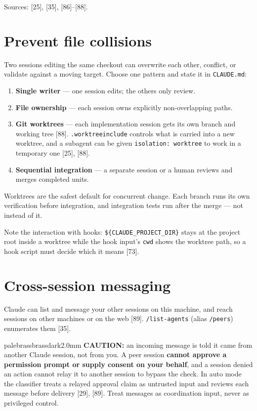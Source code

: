 \documentclass[11pt,a4paper,twoside,openany]{book}
\begin{document}
Sources: [25], [35], [86]–[88].


\FloatBarrier
\setcounter{section}{1}
\section{Prevent file collisions}

Two sessions editing the same checkout can overwrite each other, conflict, or validate against a moving target. Choose one pattern and state it in \texttt{CLAUDE.\allowbreak{}md}:


\begin{enumerate}
\item \textbf{Single writer} — one session edits; the others only review.
\item \textbf{File ownership} — each session owns explicitly non-overlapping paths.
\item \textbf{Git worktrees} — each implementation session gets its own branch and working tree [88]. \texttt{.\allowbreak{}worktreeinc\allowbreak{}lude} controls what is carried into a new worktree, and a subagent can be given \texttt{isolation:\allowbreak{} worktree} to work in a temporary one [25], [88].
\item \textbf{Sequential integration} — a separate session or a human reviews and merges completed units.
\end{enumerate}

Worktrees are the safest default for concurrent change. Each branch runs its own verification before integration, and integration tests run after the merge — not instead of it.


Note the interaction with hooks: \texttt{\$\{CLAUDE\_\allowbreak{}PROJECT\_\allowbreak{}DIR\}} stays at the project root inside a worktree while the hook input's \texttt{cwd} shows the worktree path, so a hook script must decide which it means [73].


\FloatBarrier
\setcounter{section}{2}
\section{Cross-session messaging}

Claude can list and message your other sessions on this machine, and reach sessions on other machines or on the web [89]. \texttt{/\allowbreak{}list-\allowbreak{}agents} (alias \texttt{/\allowbreak{}peers}) enumerates them [35].


\begin{calloutbox}{palebrass}{brassdark}{2.0mm}
\textbf{CAUTION:} an incoming message is told it came from another Claude session, not from you. A peer session \textbf{cannot approve a permission prompt or supply consent on your behalf}, and a session denied an action cannot relay it to another session to bypass the check. In auto mode the classifier treats a relayed approval claim as untrusted input and reviews each message before delivery [29], [89]. Treat messages as coordination input, never as privileged control.
\end{calloutbox}
\end{document}

